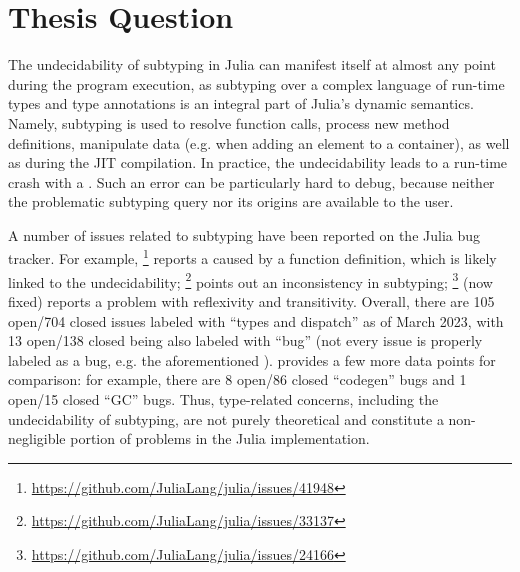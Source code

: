 \chapter{Thesis Question}\label{chap:3}

The undecidability of subtyping in Julia
can manifest itself at almost any point during the program execution,
as subtyping over a complex language of run-time types and type annotations
is an integral part of Julia's dynamic semantics.
Namely, subtyping is used to resolve function calls,
process new method definitions,
manipulate data (e.g. when adding an element to a container),
as well as during the JIT compilation.
In practice, the undecidability %
leads to 
a run-time crash with a .
Such an error can be particularly hard to debug,
because neither the problematic subtyping query nor its origins are available
to the user.

A number of issues related to subtyping have been reported
on the Julia bug tracker. For example,
\href{https://github.com/JuliaLang/julia/issues/41948}{}\footnote{
    \url{https://github.com/JuliaLang/julia/issues/41948}
} reports a  caused by a function definition,
which is likely linked to the undecidability;
\href{https://github.com/JuliaLang/julia/issues/33137}{}\footnote{
    \url{https://github.com/JuliaLang/julia/issues/33137}
} points out an inconsistency in subtyping; %
\href{https://github.com/JuliaLang/julia/issues/24166}{}\footnote{
    \url{https://github.com/JuliaLang/julia/issues/24166} 
} (now fixed) reports a problem with reflexivity and transitivity.
Overall, there are 105 open/704 closed issues labeled with ``types and
dispatch'' as of March 2023,
with 13 open/138 closed being also labeled with ``bug''
(not every issue is properly labeled as a bug,
e.g. the aforementioned
\href{https://github.com/JuliaLang/julia/issues/24166}{}).
 provides a few more data points for comparison:
for example, there are 8 open/86 closed ``codegen'' bugs
and 1 open/15 closed ``GC'' bugs.
Thus, type-related concerns, including the undecidability of subtyping,
are not purely theoretical and
constitute a non-negligible portion of problems in the Julia implementation.

